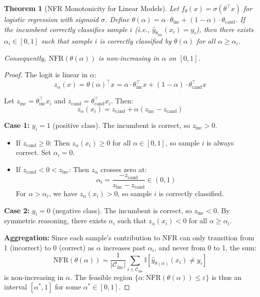 \documentclass[12pt, letterpaper]{article}
\newtheorem{theorem}{Theorem}[section]
\theoremstyle{remark}
\begin{document}
\begin{theorem}[NFR Monotonicity for Linear Models]\label{thm:nfr-monotonic}
Let $f_\theta(x) = \sigma(\theta^\top x)$ for logistic regression with sigmoid $\sigma$. Define $\theta(\alpha) = \alpha \cdot \theta_{\mathrm{inc}} + (1-\alpha) \cdot \theta_{\mathrm{cand}}$. If the incumbent correctly classifies sample $i$ (i.e., $\hat{y}_{\theta_{\mathrm{inc}}}(x_i) = y_i$), then there exists $\alpha_i \in [0,1]$ such that sample $i$ is correctly classified by $\theta(\alpha)$ for all $\alpha \geq \alpha_i$.

Consequently, $\mathrm{NFR}(\theta(\alpha))$ is non-increasing in $\alpha$ on $[0,1]$.
\end{theorem}

\begin{proof}
The logit is linear in $\alpha$:
\[
z_\alpha(x) = \theta(\alpha)^\top x = \alpha \cdot \theta_{\mathrm{inc}}^\top x + (1-\alpha) \cdot \theta_{\mathrm{cand}}^\top x
\]

Let $z_{\mathrm{inc}} = \theta_{\mathrm{inc}}^\top x_i$ and $z_{\mathrm{cand}} = \theta_{\mathrm{cand}}^\top x_i$. Then:
\[
z_\alpha(x_i) = z_{\mathrm{cand}} + \alpha (z_{\mathrm{inc}} - z_{\mathrm{cand}})
\]

\textbf{Case 1:} $y_i = 1$ (positive class). The incumbent is correct, so $z_{\mathrm{inc}} > 0$.
\begin{itemize}
\item If $z_{\mathrm{cand}} \geq 0$: Then $z_\alpha(x_i) \geq 0$ for all $\alpha \in [0,1]$, so sample $i$ is always correct. Set $\alpha_i = 0$.
\item If $z_{\mathrm{cand}} < 0 < z_{\mathrm{inc}}$: Then $z_\alpha$ crosses zero at:
\[
\alpha_i = \frac{-z_{\mathrm{cand}}}{z_{\mathrm{inc}} - z_{\mathrm{cand}}} \in (0,1)
\]
For $\alpha > \alpha_i$, we have $z_\alpha(x_i) > 0$, so sample $i$ is correctly classified.
\end{itemize}

\textbf{Case 2:} $y_i = 0$ (negative class). The incumbent is correct, so $z_{\mathrm{inc}} < 0$. By symmetric reasoning, there exists $\alpha_i$ such that $z_\alpha(x_i) < 0$ for all $\alpha \geq \alpha_i$.

\textbf{Aggregation:} Since each sample's contribution to NFR can only transition from 1 (incorrect) to 0 (correct) as $\alpha$ increases past $\alpha_i$, and never from 0 to 1, the sum:
\[
\mathrm{NFR}(\theta(\alpha)) = \frac{1}{|\mathcal{C}_{\mathrm{inc}}|} \sum_{i \in \mathcal{C}_{\mathrm{inc}}} \mathbb{I}[\hat{y}_{\theta(\alpha)}(x_i) \neq y_i]
\]
is non-increasing in $\alpha$. The feasible region $\{\alpha : \mathrm{NFR}(\theta(\alpha)) \leq \varepsilon\}$ is thus an interval $[\alpha^*, 1]$ for some $\alpha^* \in [0,1]$.
\end{proof}
\end{document}
